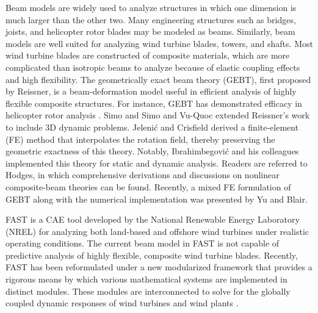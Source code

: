 \documentclass{aiaa-tc}
\begin{document}
Beam models are widely used to analyze structures in which one dimension is much larger than the other two.  Many engineering
structures such as  bridges, joists, and helicopter
rotor blades may be modeled as beams.  Similarly, beam models are well suited for analyzing wind turbine blades, towers, and shafts.  Most wind turbine
blades are constructed of composite materials, which are more complicated than isotropic beams to analyze because of elastic coupling
effects and high flexibility.  The geometrically exact beam theory (GEBT), first proposed by
Reissner\cite{Ressiner1973}, is a beam-deformation model useful in efficient analysis of highly flexible composite structures.
For instance, GEBT has demonstrated efficacy in helicopter rotor analysis \cite{Hodges:2007}. 
Simo\cite{Simo1985} and Simo and Vu-Quoc\cite{Simo1986} extended Reissner's
work to include 3D dynamic problems. Jeleni\'c and
Crisfield\cite{Crisfield1999} derived a finite-element (FE) method that
interpolates the rotation field, thereby preserving the geometric exactness
of this theory. Notably, Ibrahimbegovi\'c and his colleagues
implemented this theory for static\cite{Ibrahim1995} and
dynamic\cite{Ibrahim1998} analysis. Readers are referred to
Hodges\cite{HodgesBeamBook}, in which comprehensive derivations and discussions
on nonlinear composite-beam theories can be found. Recently, a mixed
 FE formulation of GEBT along with the numerical implementation was presented by
Yu and Blair\cite{YuGEBT}.  

FAST is a CAE tool developed by the National Renewable Energy Laboratory
(NREL) for analyzing both land-based and
offshore wind turbines under realistic operating conditions.  The current
beam model in FAST is not capable of predictive analysis of highly flexible,
composite wind turbine blades.
Recently, FAST has been reformulated under a
new modularized framework that provides a rigorous means by which various
mathematical systems are implemented in distinct modules. These modules are interconnected
to solve for the globally coupled dynamic responses of wind turbines and wind
plants \cite{Jonkman:2013,website:FASTModularizationFramework}.
\end{document}
